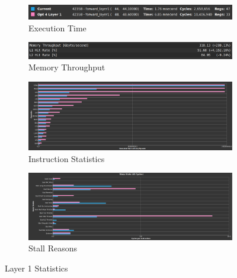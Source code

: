 \documentclass{article}
\begin{document}
\begin{figure}[H]
    \centering
    \begin{subfigure}[b]{\linewidth}
        \includegraphics[width=\linewidth]{reg_share_layer1_summary}
        \caption{Execution Time}
    \end{subfigure}
    \begin{subfigure}[b]{\linewidth}
        \includegraphics[width=\linewidth]{reg_share_layer1_mem}
        \caption{Memory Throughput}
    \end{subfigure}
    \begin{subfigure}[b]{\linewidth}
        \includegraphics[width=\linewidth]{reg_share_layer1_opcode}
        \caption{Instruction Statistics}
    \end{subfigure}
    \begin{subfigure}[b]{\linewidth}
        \includegraphics[width=\linewidth]{reg_share_layer1_warp}
        \caption{Stall Reasons}
    \end{subfigure}
    \caption{Layer 1 Statistics}
\end{figure}
\end{document}
